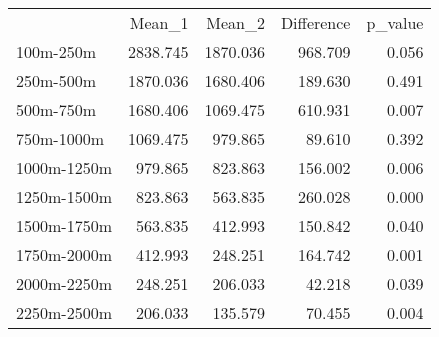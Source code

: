 
\centering
\begin{tabular}{lllll}
\cline{1-5}
\multicolumn{1}{c}{} &
  \multicolumn{1}{|r}{Mean\_1} &
  \multicolumn{1}{r}{Mean\_2} &
  \multicolumn{1}{r}{Difference} &
  \multicolumn{1}{r}{p\_value} \\
\cline{1-5}
\multicolumn{1}{l}{100m-250m} &
  \multicolumn{1}{|r}{2838.745} &
  \multicolumn{1}{r}{1870.036} &
  \multicolumn{1}{r}{968.709} &
  \multicolumn{1}{r}{0.056} \\
\multicolumn{1}{l}{250m-500m} &
  \multicolumn{1}{|r}{1870.036} &
  \multicolumn{1}{r}{1680.406} &
  \multicolumn{1}{r}{189.630} &
  \multicolumn{1}{r}{0.491} \\
\multicolumn{1}{l}{500m-750m} &
  \multicolumn{1}{|r}{1680.406} &
  \multicolumn{1}{r}{1069.475} &
  \multicolumn{1}{r}{610.931} &
  \multicolumn{1}{r}{0.007} \\
\multicolumn{1}{l}{750m-1000m} &
  \multicolumn{1}{|r}{1069.475} &
  \multicolumn{1}{r}{979.865} &
  \multicolumn{1}{r}{89.610} &
  \multicolumn{1}{r}{0.392} \\
\multicolumn{1}{l}{1000m-1250m} &
  \multicolumn{1}{|r}{979.865} &
  \multicolumn{1}{r}{823.863} &
  \multicolumn{1}{r}{156.002} &
  \multicolumn{1}{r}{0.006} \\
\multicolumn{1}{l}{1250m-1500m} &
  \multicolumn{1}{|r}{823.863} &
  \multicolumn{1}{r}{563.835} &
  \multicolumn{1}{r}{260.028} &
  \multicolumn{1}{r}{0.000} \\
\multicolumn{1}{l}{1500m-1750m} &
  \multicolumn{1}{|r}{563.835} &
  \multicolumn{1}{r}{412.993} &
  \multicolumn{1}{r}{150.842} &
  \multicolumn{1}{r}{0.040} \\
\multicolumn{1}{l}{1750m-2000m} &
  \multicolumn{1}{|r}{412.993} &
  \multicolumn{1}{r}{248.251} &
  \multicolumn{1}{r}{164.742} &
  \multicolumn{1}{r}{0.001} \\
\multicolumn{1}{l}{2000m-2250m} &
  \multicolumn{1}{|r}{248.251} &
  \multicolumn{1}{r}{206.033} &
  \multicolumn{1}{r}{42.218} &
  \multicolumn{1}{r}{0.039} \\
\multicolumn{1}{l}{2250m-2500m} &
  \multicolumn{1}{|r}{206.033} &
  \multicolumn{1}{r}{135.579} &
  \multicolumn{1}{r}{70.455} &
  \multicolumn{1}{r}{0.004} \\
\cline{1-5}
\end{tabular}

